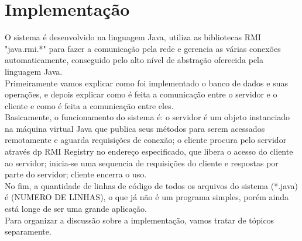 \documentclass[11pt,twoside]{article}
\begin{document}
\section{Implementação}
O sistema é desenvolvido na linguagem Java, utiliza as bibliotecas RMI "java.rmi.*" para fazer a comunicação pela rede e gerencia as várias conexões automaticamente, conseguido pelo alto nível de abstração oferecida pela linguagem Java.\\
Primeiramente vamos explicar como foi implementado o banco de dados e suas operações, e depois explicar como é feita a comunicação entre o servidor e o cliente e como é feita a comunicação entre eles.\\
Basicamente, o funcionamento do sistema é: o servidor é um objeto instanciado na máquina virtual Java que publica seus métodos para serem acessados remotamente e aguarda requisições de conexão; o cliente procura pelo servidor através dp RMI Registry no endereço especificado, que libera o acesso do cliente ao servidor; inicia-se uma sequencia de requisições do cliente e respostas por parte do servidor; cliente encerra o uso.\\

No fim, a quantidade de linhas de código de todos os arquivos do sistema (*.java) é (NUMERO DE LINHAS), o que já não é um programa simples, porém ainda está longe de ser uma grande aplicação.\\

Para organizar a discussão sobre a implementação, vamos tratar de tópicos separamente.\\
\end{document}
